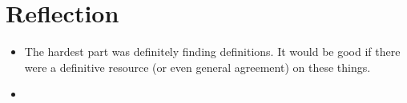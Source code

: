 \section{Reflection}
\label{sec:reflection}

\begin{itemize}
\item The hardest part was definitely finding definitions.
  It would be good if there were a definitive resource
  (or even general agreement) on these things.
\item 
\end{itemize}

